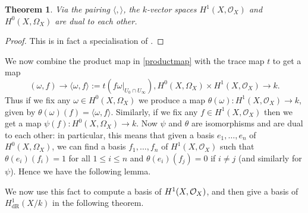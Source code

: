 \documentclass[draft, 11pt]{article} %
\theoremstyle{plain}
\newtheorem{thm}[defn]{Theorem}
\theoremstyle{remark}
\newcommand{\cO}{{\cal O}}
\newcommand{\ra}{\rightarrow}
\newcommand{\hzero}{{H^0(X,\Omega_X)}}
\newcommand{\hone}{H^1(X,\mathcal{O}_X)}
\newcommand{\derhamhone}{H_{\text {dR}}^1(X/k)}
\begin{document}
\begin{thm}\label{serredualitytheorem}
Via the pairing $\langle , \rangle$, the $k$-vector spaces $\hone$ and $\hzero$ are dual to each other.
\end{thm}
\begin{proof}
This is in fact a specialisation of \cite[Thm. 2, Chap. II]{algebraicgroupsandclassfields}.
\end{proof}

We now combine the product map in \eqref{productmap} with the trace map $t$ to get a map 
\[
(\omega, f) \to \langle \omega, f \rangle := t \left( f \omega |_{U_0 \cap U_\infty}\right) , \hzero \times \hone \ra k. 
\]
Thus if we fix any $\omega \in \hzero$ we produce a map $\theta(\omega)\colon \hone \ra k$, given by $\theta(\omega)(f) = \langle \omega , f\rangle$.
Similarly, if we fix any $f \in \hone$ then we get a map $\psi(f) \colon \hzero \ra k$.
Now $\psi$ and $\theta$ are isomorphisms and are dual to each other: in particular, this means that given a basis $e_1, \ldots, e_n$ of $\hzero$, we can find a basis $f_1, \ldots , f_n$ of $\hone$ such that $\theta(e_i)(f_i) = 1$ for all $1 \leq i \leq n$ and $\theta(e_i)(f_j) = 0$ if $i \neq j$ (and similarly for $\psi$).
Hence we have the following lemma.


We now use this fact to compute a basis of $H^1(X,\cO_X)$, and then give a basis of $\derhamhone$ in the following theorem.
\end{document}
